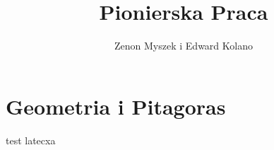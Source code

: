 \documentclass[12pt]{article}
\title{Pionierska Praca}
\author{Zenon Myszek i Edward Kolano}
\begin{document}
\maketitle
\newpage

\pagestyle{plain}

\section{Geometria i Pitagoras}
test latecxa
\end{document}
